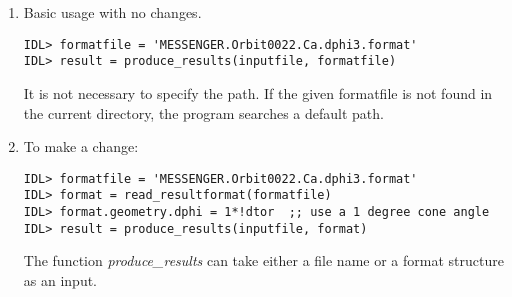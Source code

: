 \documentclass[11pt]{article}
\begin{document}
\begin{enumerate}
\item Basic usage with no changes.
\begin{verbatim}
IDL> formatfile = 'MESSENGER.Orbit0022.Ca.dphi3.format'
IDL> result = produce_results(inputfile, formatfile)
\end{verbatim}
It is not necessary to specify the path. If the given formatfile is not found in the
current directory, the program searches a default path.

\item To make a change:
\begin{verbatim}
IDL> formatfile = 'MESSENGER.Orbit0022.Ca.dphi3.format'
IDL> format = read_resultformat(formatfile)
IDL> format.geometry.dphi = 1*!dtor  ;; use a 1 degree cone angle
IDL> result = produce_results(inputfile, format)
\end{verbatim}
The function \textit{produce\_results} can take either a file name or a format structure
as an input.
\end{enumerate}
\end{document}
